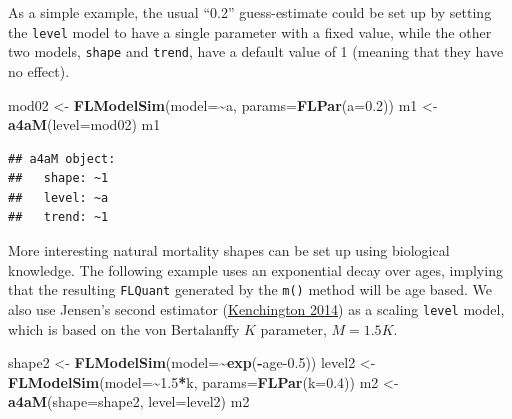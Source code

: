 \documentclass[
]{book}
\newenvironment{Shaded}{\begin{snugshade}}{\end{snugshade}}
\newcommand{\AttributeTok}[1]{\textcolor[rgb]{0.13,0.29,0.53}{#1}}
\newcommand{\FloatTok}[1]{\textcolor[rgb]{0.00,0.00,0.81}{#1}}
\newcommand{\FunctionTok}[1]{\textcolor[rgb]{0.13,0.29,0.53}{\textbf{#1}}}
\newcommand{\NormalTok}[1]{#1}
\newcommand{\OtherTok}[1]{\textcolor[rgb]{0.56,0.35,0.01}{#1}}
\newcommand{\SpecialCharTok}[1]{\textcolor[rgb]{0.81,0.36,0.00}{\textbf{#1}}}
\begin{document}
As a simple example, the usual ``0.2'' guess-estimate could be set up by setting the \texttt{level} model to have a single parameter with a fixed value, while the other two models, \texttt{shape} and \texttt{trend}, have a default value of 1 (meaning that they have no effect).

\begin{Shaded}
\begin{Highlighting}[]
\NormalTok{mod02 }\OtherTok{\textless{}{-}} \FunctionTok{FLModelSim}\NormalTok{(}\AttributeTok{model=}\SpecialCharTok{\textasciitilde{}}\NormalTok{a, }\AttributeTok{params=}\FunctionTok{FLPar}\NormalTok{(}\AttributeTok{a=}\FloatTok{0.2}\NormalTok{))}
\NormalTok{m1 }\OtherTok{\textless{}{-}} \FunctionTok{a4aM}\NormalTok{(}\AttributeTok{level=}\NormalTok{mod02)}
\NormalTok{m1}
\end{Highlighting}
\end{Shaded}

\begin{verbatim}
## a4aM object:
##   shape: ~1
##   level: ~a
##   trend: ~1
\end{verbatim}

More interesting natural mortality shapes can be set up using biological knowledge. The following example uses an exponential decay over ages, implying that the resulting \texttt{FLQuant} generated by the \texttt{m()} method will be age based. We also use Jensen's second estimator (\protect\hyperlink{ref-Kenchington2014}{Kenchington 2014}) as a scaling \texttt{level} model, which is based on the von Bertalanffy \(K\) parameter, \(M=1.5K\).

\begin{Shaded}
\begin{Highlighting}[]
\NormalTok{shape2 }\OtherTok{\textless{}{-}} \FunctionTok{FLModelSim}\NormalTok{(}\AttributeTok{model=}\SpecialCharTok{\textasciitilde{}}\FunctionTok{exp}\NormalTok{(}\SpecialCharTok{{-}}\NormalTok{age}\FloatTok{{-}0.5}\NormalTok{))}
\NormalTok{level2 }\OtherTok{\textless{}{-}} \FunctionTok{FLModelSim}\NormalTok{(}\AttributeTok{model=}\SpecialCharTok{\textasciitilde{}}\FloatTok{1.5}\SpecialCharTok{*}\NormalTok{k, }\AttributeTok{params=}\FunctionTok{FLPar}\NormalTok{(}\AttributeTok{k=}\FloatTok{0.4}\NormalTok{))}
\NormalTok{m2 }\OtherTok{\textless{}{-}} \FunctionTok{a4aM}\NormalTok{(}\AttributeTok{shape=}\NormalTok{shape2, }\AttributeTok{level=}\NormalTok{level2)}
\NormalTok{m2}
\end{Highlighting}
\end{Shaded}
\end{document}
